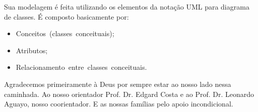 Sua modelagem é feita utilizando os elementos da notação UML para diagrama de classes. É composto basicamente por:

\begin{itemize}
	\item Conceitos (classes conceituais);
	\item Atributos;
	\item Relacionamento entre classes conceituais.
\end{itemize}



Agradecemos primeiramente à Deus por sempre estar ao nosso lado nessa caminhada. Ao nosso orientador Prof. Dr. Edgard Costa e ao Prof. Dr. Leonardo Aguayo, nosso coorientador. E as nossas famílias pelo apoio incondicional. 





